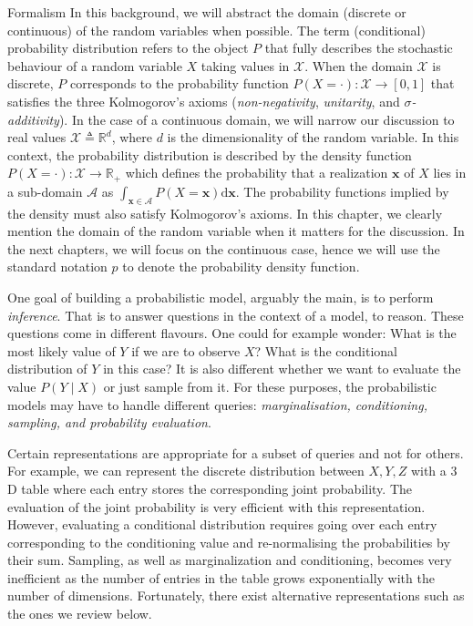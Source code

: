 \begin{side_note}{Formalism}
  In this background, we will abstract the domain (discrete or continuous) of the random variables when possible. The term (conditional) probability distribution refers to the object $P$ that fully describes the stochastic behaviour of a random variable $X$ taking values in $\mathcal{X}$. When the domain $\mathcal{X}$ is discrete, $P$ corresponds to the probability function $P(X=\cdot): \mathcal{X} \rightarrow \left[0, 1 \right]$ that satisfies the three Kolmogorov's axioms (\textit{non-negativity}, \textit{unitarity}, and \textit{$\sigma$-\textit{additivity}}). In the case of a continuous domain, we will narrow our discussion to real values $\mathcal{X} \triangleq \mathbb{R}^d$, where $d$ is the dimensionality of the random variable. In this context, the probability distribution is described by the density function $P(X=\cdot): \mathcal{X} \rightarrow \mathbb{R}_{+}$ which defines the probability that a realization $\bm{x}$ of $X$ lies in a sub-domain $\mathcal{A}$ as $\int_{\bm{x} \in \mathcal{A}} P(X=\bm{x}) \text{d} \bm{x}$. The probability functions implied by the density must also satisfy Kolmogorov's axioms. In this chapter, we clearly mention the domain of the random variable when it matters for the discussion. In the next chapters, we will focus on the continuous case, hence we will use the standard notation $p$ to denote the probability density function.
\end{side_note}

One goal of building a probabilistic model, arguably the main, is to perform \textit{inference}. That is to answer questions in the context of a model, to reason. These questions come in different flavours. One could for example wonder: What is the most likely value of $Y$ if we are to observe $X$? What is the conditional distribution of $Y$ in this case? It is also different whether we want to evaluate the value $P(Y \mid X)$ or just sample from it. For these purposes, the probabilistic models may have to handle different queries: \textit{marginalisation, conditioning, sampling, and probability evaluation}.

Certain representations are appropriate for a subset of queries and not for others. For example, we can represent the discrete distribution between $X, Y, Z$ with a $3$D table where each entry stores the corresponding joint probability. The evaluation of the joint probability is very efficient with this representation. However, evaluating a conditional distribution requires going over each entry corresponding to the conditioning value and re-normalising the probabilities by their sum. Sampling, as well as marginalization and conditioning, becomes very inefficient as the number of entries in the table grows exponentially with the number of dimensions. Fortunately, there exist alternative representations such as the ones we review below.

